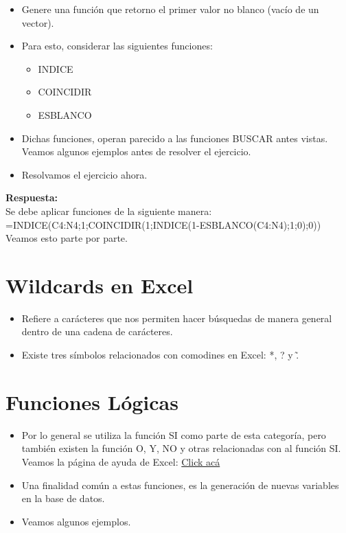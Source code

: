 \documentclass[12 pt,letterpaper]{article}
\newenvironment{solution}
{\begin{mdframed} \textbf{Respuesta:} \ \\}
	{\end{mdframed}}
\begin{document}
\begin{itemize}
	\item Genere una función que retorno el primer valor no blanco (vacío de un vector).
	
	\item Para esto, considerar las siguientes funciones:
	
	\begin{itemize}
		\item INDICE
		\item COINCIDIR
		\item ESBLANCO
	\end{itemize}

	\item Dichas funciones, operan parecido a las funciones BUSCAR antes vistas. Veamos algunos ejemplos antes de resolver el ejercicio. 
	
	\item Resolvamos el ejercicio ahora.
	
\end{itemize}

\begin{solution}
	Se debe aplicar funciones de la siguiente manera:\\
	
	=INDICE(C4:N4;1;COINCIDIR(1;INDICE(1-ESBLANCO(C4:N4);1;0);0)) \\
	
	Veamos esto parte por parte.
\end{solution} 

\section{Wildcards en Excel}

\begin{itemize}
	\item Refiere a carácteres que nos permiten hacer búsquedas de manera general dentro de una cadena de carácteres. 
	
	\item Existe tres símbolos relacionados con comodines en Excel: *, ? y \~.
\end{itemize}

\section{Funciones Lógicas}

\begin{itemize}
	\item Por lo general se utiliza la función SI como parte de esta categoría, pero también existen la función O, Y, NO y otras relacionadas con al función SI. Veamos la página de ayuda de Excel:  \href{https://support.microsoft.com/es-es/office/funciones-lógicas-referencia-e093c192-278b-43f6-8c3a-b6ce299931f5}{Click acá}
	
	\item Una finalidad común a estas funciones, es la generación de nuevas variables en la base de datos. 
	
	\item Veamos algunos ejemplos. 
\end{itemize}
\end{document}
